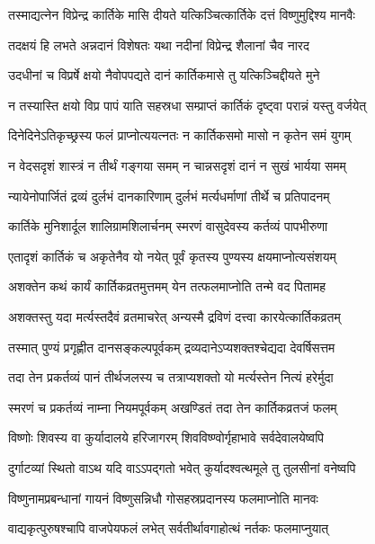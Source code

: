 \twolineshloka
{तस्माद्यत्नेन विप्रेन्द्र कार्तिके मासि दीयते}
{यत्किञ्चित्कार्तिके दत्तं विष्णुमुद्दिश्य मानवैः} %

\twolineshloka
{तदक्षयं हि लभते अन्नदानं विशेषतः}
{यथा नदीनां विप्रेन्द्र शैलानां चैव नारद} %

\twolineshloka
{उदधीनां च विप्रर्षे क्षयो नैवोपपद्यते}
{दानं कार्तिकमासे तु यत्किञ्चिद्दीयते मुने} %

\twolineshloka
{न तस्यास्ति क्षयो विप्र पापं याति सहस्रधा}
{सम्प्राप्तं कार्तिकं दृष्ट्वा परान्नं यस्तु वर्जयेत्} %

\twolineshloka
{दिनेदिनेऽतिकृच्छ्रस्य फलं प्राप्नोत्ययत्नतः}
{न कार्तिकसमो मासो न कृतेन समं युगम्} %

\twolineshloka
{न वेदसदृशं शास्त्रं न तीर्थं गङ्गया समम्}
{न चान्नसदृशं दानं न सुखं भार्यया समम्} %

\twolineshloka
{न्यायेनोपार्जितं द्रव्यं दुर्लभं दानकारिणाम्}
{दुर्लभं मर्त्यधर्माणां तीर्थे च प्रतिपादनम्} %

\twolineshloka
{कार्तिके मुनिशार्दूल शालिग्रामशिलार्चनम्}
{स्मरणं वासुदेवस्य कर्तव्यं पापभीरुणा} %

\twolineshloka
{एतादृशं कार्तिकं च अकृतेनैव यो नयेत्}
{पूर्वं कृतस्य पुण्यस्य क्षयमाप्नोत्यसंशयम्} %


\twolineshloka
{अशक्तेन कथं कार्यं कार्तिकव्रतमुत्तमम्}
{येन तत्फलमाप्नोति तन्मे वद पितामह} %


\twolineshloka
{अशक्तस्तु यदा मर्त्यस्तदैवं व्रतमाचरेत्}
{अन्यस्मै द्रविणं दत्त्वा कारयेत्कार्तिकव्रतम्} %

\twolineshloka
{तस्मात् पुण्यं प्रगृह्णीत दानसङ्कल्पपूर्वकम्}
{द्रव्यदानेऽप्यशक्तश्चेद्यदा देवर्षिसत्तम} %

\twolineshloka
{तदा तेन प्रकर्तव्यं पानं तीर्थजलस्य च}
{तत्राप्यशक्तो यो मर्त्यस्तेन नित्यं हरेर्मुदा} %

\twolineshloka
{स्मरणं च प्रकर्तव्यं नाम्ना नियमपूर्वकम्}
{अखण्डितं तदा तेन कार्तिकव्रतजं फलम्} %

\twolineshloka
{विष्णोः शिवस्य वा कुर्यादालये हरिजागरम्}
{शिवविष्ण्वोर्गृहाभावे सर्वदेवालयेष्वपि} %

\twolineshloka
{दुर्गाटव्यां स्थितो वाऽथ यदि वाऽऽपद्गतो भवेत्}
{कुर्यादश्वत्थमूले तु तुलसीनां वनेष्वपि} %

\twolineshloka
{विष्णुनामप्रबन्धानां गायनं विष्णुसन्निधौ}
{गोसहस्रप्रदानस्य फलमाप्नोति मानवः} %

\twolineshloka
{वाद्यकृत्पुरुषश्चापि वाजपेयफलं लभेत्}
{सर्वतीर्थावगाहोत्थं नर्तकः फलमाप्नुयात्} %

